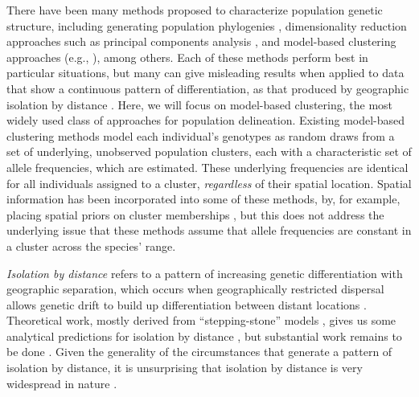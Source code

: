 \documentclass[10pt,letterpaper]{article}
\begin{document}
There have been many methods proposed to characterize population
genetic structure,
including generating population phylogenies \cite{CavalliSforza1975, treemix},
dimensionality reduction approaches \cite{meirmans2009genodive}
such as principal components analysis 
\cite{menozzi1978synthetic,novembre_interpreting_2008, price2006eigenstrat},
and model-based clustering approaches 
(e.g., \cite{STRUCTURE, falush2003, hubisz2009,ADMIXTURE, 
FINESTRUCTURE, fastStructure, huelsenbeck2007inference, 
Corander2003,TESS,geneland}), among others.
Each of these methods perform best in particular situations,
but many can give misleading results when applied to data 
that show a continuous pattern of differentiation,
as that produced by geographic isolation by distance 
\cite{Wright1943, novembre_interpreting_2008, Frantz2009}.
Here, we will focus on model-based clustering, the most widely used class of approaches for population delineation.
Existing model-based clustering methods model each individual's genotypes 
as random draws from a set of underlying, unobserved population clusters, 
each with a characteristic set of allele frequencies, which are estimated. 
These underlying frequencies are identical 
for all individuals assigned to a cluster, 
\emph{regardless} of their spatial location. 
Spatial information has been incorporated into some of these methods, 
by, for example, placing spatial priors on cluster memberships \cite{geneland,TESS}, 
but this does not address the underlying issue that 
these methods assume that allele frequencies 
are constant in a cluster across the species' range.  

\emph{Isolation by distance} refers to a pattern of increasing genetic differentiation
with geographic separation,
which occurs when geographically restricted dispersal allows
genetic drift to build up differentiation between distant locations
\cite{Wright1943}. 
Theoretical work,
mostly derived from ``stepping-stone'' models 
\cite{kimura1964stepping,sawyer1976stepping,shiga1984stepping},
gives us some analytical predictions for isolation by distance
\cite{malecot1969mathematics,Slatkin1985,epperson2003geographical}, 
but substantial work remains to be done \cite{barton2002neutral,barton2013modelling}.
Given the generality of the circumstances that generate a pattern of isolation by distance, 
it is unsurprising that isolation by distance is very widespread in nature \cite{meirmans2012,Sexton_etal_2014}.
\end{document}
